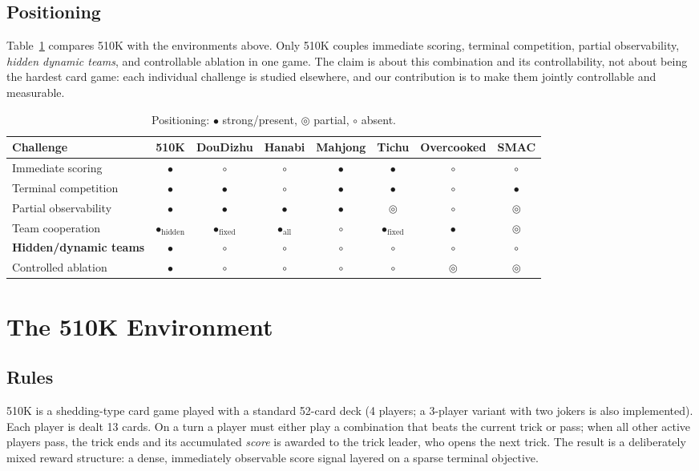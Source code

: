 \documentclass{article}
\newcommand{\cmark}{\ensuremath{\bullet}}
\newcommand{\pmark}{\ensuremath{\circ}}
\newcommand{\hmark}{\ensuremath{\circledcirc}}
\begin{document}
\subsection{Positioning}
Table~\ref{tab:positioning} compares 510K with the environments above. Only 510K
couples immediate scoring, terminal competition, partial observability,
\emph{hidden dynamic teams}, and controllable ablation in one game. The claim is
about this combination and its controllability, not about being the hardest card
game: each individual challenge is studied elsewhere, and our contribution is to
make them jointly controllable and measurable.

\begin{table}[t]
\centering
\footnotesize
\setlength{\tabcolsep}{3pt}
\caption{Positioning: \cmark{} strong/present, \hmark{} partial, \pmark{} absent.}
\label{tab:positioning}
\begin{tabular}{lccccccc}
\toprule
Challenge & 510K & DouDizhu & Hanabi & Mahjong & Tichu & Overcooked & SMAC \\
\midrule
Immediate scoring & \cmark & \pmark & \pmark & \cmark & \cmark & \pmark & \pmark \\
Terminal competition & \cmark & \cmark & \pmark & \cmark & \cmark & \pmark & \cmark \\
Partial observability & \cmark & \cmark & \cmark & \cmark & \hmark & \pmark & \hmark \\
Team cooperation & \cmark$_{\text{hidden}}$ & \cmark$_{\text{fixed}}$ & \cmark$_{\text{all}}$ & \pmark & \cmark$_{\text{fixed}}$ & \cmark & \hmark \\
\textbf{Hidden/dynamic teams} & \textbf{\cmark} & \pmark & \pmark & \pmark & \pmark & \pmark & \pmark \\
Controlled ablation & \cmark & \pmark & \pmark & \pmark & \pmark & \hmark & \hmark \\
\bottomrule
\end{tabular}
\end{table}

\section{The 510K Environment}
\subsection{Rules}
510K is a shedding-type card game played with a standard 52-card deck (4
players; a 3-player variant with two jokers is also implemented). Each player is
dealt 13 cards. On a turn a player must either play a combination that beats the
current trick or pass; when all other active players pass, the trick ends and
its accumulated \emph{score} is awarded to the trick leader, who opens the next
trick. The result is a deliberately mixed reward structure: a dense, immediately
observable score signal layered on a sparse terminal objective.
\end{document}
